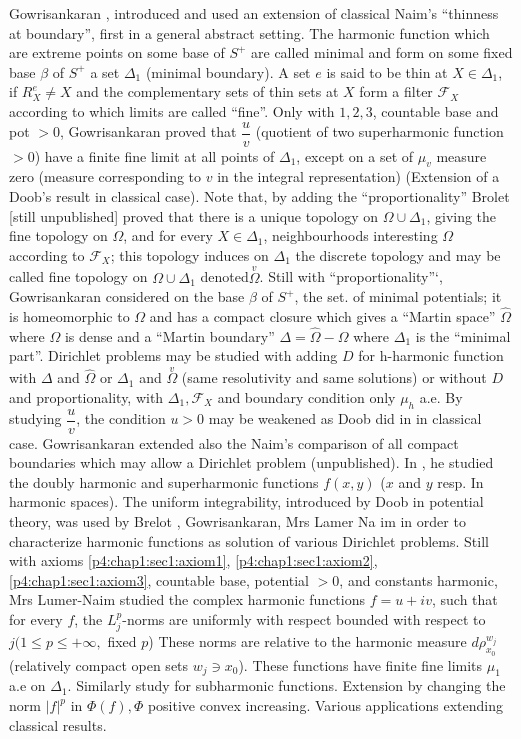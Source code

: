 Gowrisankaran \cite{38}, \cite{41} introduced and used an extension of classical
Naim's ``thinness at boundary'', first in a general abstract
setting. The harmonic function which are extreme points on some base
of $S^+$ are called minimal and form on some fixed base $\beta$ of
$S^+$ a set $\Delta_1$ (minimal boundary). A set $e$ is said to be
thin at $X \in \Delta_1$, if $R^e_X \neq X$ and the complementary sets
of thin sets at $X$ form a filter $\mathcal{F}_X$ according to which
limits are called ``fine''. Only with $1,2,3$, countable base and pot
$>0$, Gowrisankaran proved that $\dfrac{u}{v}$ (quotient of two
superharmonic function $>0$) have a finite fine limit at all points of
$\Delta_1$, except on a set of $\mu_v$ measure zero (measure
corresponding to $v$ in the integral representation) (Extension of a
Doob's result in classical case). Note that, by adding the
``proportionality'' Brolet [still unpublished] proved that there is a
unique topology on $\Omega \cup \Delta_1$, giving the fine topology on
$\Omega$, and for every $X \in \Delta_1$, neighbourhoods interesting
$\Omega$ according to $\mathcal{F}_X$; this topology induces on
$\Delta_1$ the discrete topology and may be called fine topology on
$\Omega \cup \Delta_1$ denoted\pageoriginale $\overset{v}{\Omega}$. Still with
``proportionality''`, Gowrisankaran considered on the base $\beta$ of
$S^+$, the set. of minimal potentials; it is homeomorphic to $\Omega$
and has a compact closure which gives a ``Martin space''
$\hat{\Omega}$ where $\Omega$ is dense and a ``Martin boundary''
$\Delta=\hat{\Omega}-\Omega$ where $\Delta_1$  is the ``minimal
part''. Dirichlet problems may be studied with adding $D$ for
h-harmonic function with $\Delta$ and $\hat{\Omega}$ or $\Delta_1$ and
$\overset{v}\Omega$ (same resolutivity and same solutions) or
without $D$ and proportionality, with $\Delta_1, \mathcal{F}_X$ and
boundary condition only $\mu_h$ a.e. By studying $\dfrac{u}{v}$, the
condition $u>0$ may be weakened \cite{39} as Doob did in in classical
case. Gowrisankaran extended also the Naim's comparison of all compact
boundaries which may allow a Dirichlet problem (unpublished). In
\cite{40}, he studied the doubly harmonic and superharmonic functions
$f(x,y)$ ($x$ and $y$ resp. In harmonic spaces). The uniform
integrability, introduced by Doob in potential theory, was used by
Brelot \cite{16}, Gowrisankaran, Mrs Lamer Na im \cite{56} in order to
characterize harmonic functions as solution of various Dirichlet
problems. Still with axioms \ref{p4:chap1:sec1:axiom1},
\ref{p4:chap1:sec1:axiom2}, \ref{p4:chap1:sec1:axiom3}, countable
base, potential $>0$,   
and constants harmonic, Mrs Lumer-Naim studied the complex harmonic
functions $f=u+iv$, such that for every $f$, the $L^p_j$-norms are
uniformly with respect bounded with respect to $j(1\leq p \leq
+\infty,$ fixed $p$) These norms are relative to the harmonic measure
$d \rho_{x_0}^{w_j}$ (relatively compact open sets $w_j \ni
x_0$). These functions have finite fine limits $\mu_1$ a.e on
$\Delta_1$. Similarly study for subharmonic functions. Extension by
changing the norm $|f|^p$ in $\Phi(f), \Phi$ positive convex
increasing. Various applications extending classical results. 


